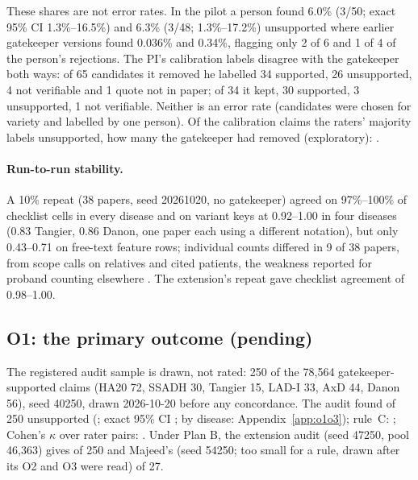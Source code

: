 \documentclass{article} %
\begin{document}
These shares are not error rates. In the pilot a person found 6.0\% (3/50; exact 95\% CI 1.3\%--16.5\%) and 6.3\% (3/48; 1.3\%--17.2\%) unsupported where earlier gatekeeper versions found 0.036\% and 0.34\%, flagging only 2 of 6 and 1 of 4 of the person's rejections. The PI's calibration labels disagree with the gatekeeper both ways: of 65 candidates it removed he labelled 34 supported, 26 unsupported, 4 not verifiable and 1 quote not in paper; of 34 it kept, 30 supported, 3 unsupported, 1 not verifiable. Neither is an error rate (candidates were chosen for variety and labelled by one person). Of the calibration claims the raters' majority labels unsupported, how many the gatekeeper had removed (exploratory): .

\paragraph{Run-to-run stability.} A 10\% repeat (38 papers, seed 20261020, no gatekeeper) agreed on 97\%--100\% of checklist cells in every disease and on variant keys at 0.92--1.00 in four diseases (0.83 Tangier, 0.86 Danon, one paper each using a different notation), but only 0.43--0.71 on free-text feature rows; individual counts differed in 9 of 38 papers, from scope calls on relatives and cited patients, the weakness reported for proband counting elsewhere \citep{murugan2026_reasoning_llm_ps4}. The extension's repeat gave checklist agreement of 0.98--1.00.

\subsection{O1: the primary outcome (pending)}
The registered audit sample is drawn, not rated: 250 of the 78,564 gatekeeper-supported claims (HA20 72, SSADH 30, Tangier 15, LAD-I 33, AxD 44, Danon 56), seed 40250, drawn 2026-10-20 before any concordance. The audit found  of 250 unsupported (; exact 95\% CI ; by disease: Appendix~\ref{app:o1o3}); rule~C: ; Cohen's $\kappa$ over rater pairs: . Under Plan B, the extension audit (seed 47250, pool 46,363) gives  of 250 and Majeed's (seed 54250; too small for a rule, drawn after its O2 and O3 were read)  of 27.
\end{document}
